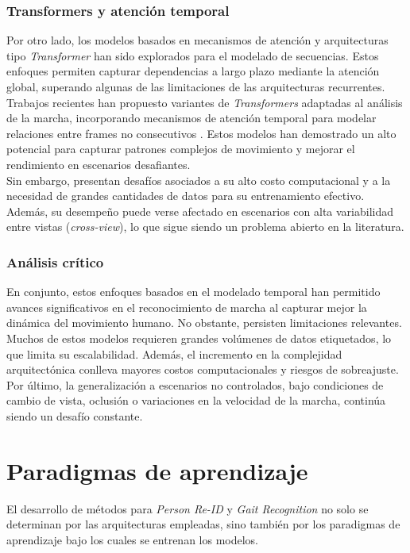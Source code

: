 \subsubsection{Transformers y atención temporal}

Por otro lado, los modelos basados en mecanismos de atención y arquitecturas tipo \textit{Transformer} han sido explorados para el modelado de secuencias. Estos enfoques permiten capturar dependencias a largo plazo mediante la atención global, superando algunas de las limitaciones de las arquitecturas recurrentes. \\
Trabajos recientes han propuesto variantes de \textit{Transformers} adaptadas al análisis de la marcha, incorporando mecanismos de atención temporal para modelar relaciones entre frames no consecutivos \cite{ReferenciaGaitFormer}. Estos modelos han demostrado un alto potencial para capturar patrones complejos de movimiento y mejorar el rendimiento en escenarios desafiantes. \\
Sin embargo, presentan desafíos asociados a su alto costo computacional y a la necesidad de grandes cantidades de datos para su entrenamiento efectivo. Además, su desempeño puede verse afectado en escenarios con alta variabilidad entre vistas (\textit{cross-view}), lo que sigue siendo un problema abierto en la literatura.

\subsubsection{Análisis crítico}

En conjunto, estos enfoques basados en el modelado temporal han permitido avances significativos en el reconocimiento de marcha al capturar mejor la dinámica del movimiento humano. No obstante, persisten limitaciones relevantes. Muchos de estos modelos requieren grandes volúmenes de datos etiquetados, lo que limita su escalabilidad. Además, el incremento en la complejidad arquitectónica conlleva mayores costos computacionales y riesgos de sobreajuste. Por último, la generalización a escenarios no controlados, bajo condiciones de cambio de vista, oclusión o variaciones en la velocidad de la marcha, continúa siendo un desafío constante.

\section{Paradigmas de aprendizaje}

El desarrollo de métodos para \textit{Person Re-ID} y \textit{Gait Recognition} no solo se determinan por las arquitecturas empleadas, sino también por los paradigmas de aprendizaje bajo los cuales se entrenan los modelos.

